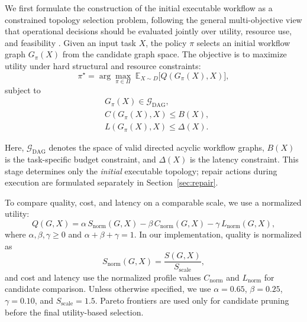 \documentclass[manuscript,review,anonymous]{acmart}
\begin{document}
We first formulate the construction of the initial executable workflow as a constrained topology selection problem, following the general multi-objective view that operational decisions should be evaluated jointly over utility, resource use, and feasibility \cite{gonzalez2022constrained,miettinen2010nonlinear,sun2023pareto,tian2024constraint}.
Given an input task $X$, the policy $\pi$ selects an initial workflow graph $G_{\pi}(X)$ from the candidate graph space.
The objective is to maximize utility under hard structural and resource constraints:
\begin{equation}
\pi^\star
=
\arg\max_{\pi\in\Pi}
\;\mathbb{E}_{X\sim D}\big[Q(G_{\pi}(X),X)\big],
\label{eq:init_obj}
\end{equation}
subject to
\begin{equation}
\begin{aligned}
&G_{\pi}(X)\in\mathcal{G}_{\mathrm{DAG}},\\
&C(G_{\pi}(X),X)\le B(X),\\
&L(G_{\pi}(X),X)\le \Delta(X).
\end{aligned}
\label{eq:init_constraints}
\end{equation}

Here, $\mathcal{G}_{\mathrm{DAG}}$ denotes the space of valid directed acyclic workflow graphs,
$B(X)$ is the task-specific budget constraint, and $\Delta(X)$ is the latency constraint.
This stage determines only the \emph{initial} executable topology; repair actions during execution are formulated separately in Section~\ref{sec:repair}.

To compare quality, cost, and latency on a comparable scale, we use a normalized utility:
\begin{equation}
Q(G,X)=\alpha\,S_{\mathrm{norm}}(G,X)-\beta\,C_{\mathrm{norm}}(G,X)-\gamma\,L_{\mathrm{norm}}(G,X),
\label{eq:utility}
\end{equation}
where $\alpha,\beta,\gamma\ge 0$ and $\alpha+\beta+\gamma=1$.
In our implementation, quality is normalized as
\begin{equation}
S_{\mathrm{norm}}(G,X)=\frac{S(G,X)}{S_{\mathrm{scale}}},
\label{eq:s_norm}
\end{equation}
and cost and latency use the normalized profile values $C_{\mathrm{norm}}$ and $L_{\mathrm{norm}}$ for candidate comparison.
Unless otherwise specified, we use $\alpha=0.65$, $\beta=0.25$, $\gamma=0.10$, and $S_{\mathrm{scale}}=1.5$.
Pareto frontiers are used only for candidate pruning before the final utility-based selection.
\end{document}
